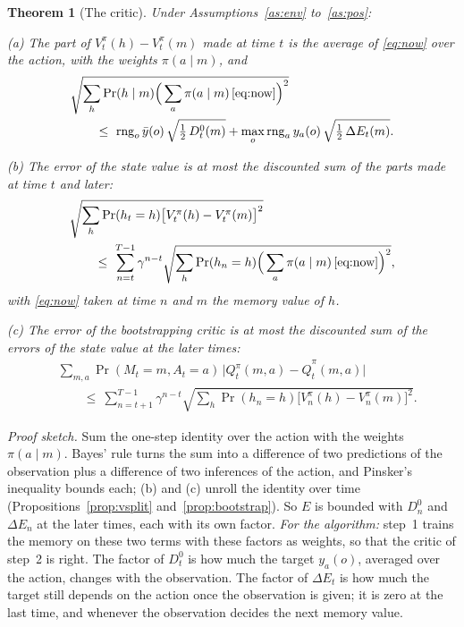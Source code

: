 \documentclass{article}
\newtheorem{theorem}{Theorem}
\newcounter{algo}
\theoremstyle{definition}
\newcommand{\dE}{\Delta E}
\newcommand{\rng}{\operatorname{rng}}
\begin{document}
\begin{theorem}[The critic]\label{thm:critic}
Under Assumptions~\ref{as:env} to~\ref{as:pos}:

(a) The part of $V^\pi_t(h)-V^\pi_t(m)$ made at time $t$ is the average of \eqref{eq:now} over the action, with the weights $\pi(a\mid m)$, and
\begin{align*}
&\sqrt{\sum_h\Pr(h\mid m)\Big(\sum_a\pi(a\mid m)\,\eqref{eq:now}\Big)^2}\\
&\qquad\le\ \rng_o\bar y(o)\,\sqrt{\tfrac12\,D^0_t(m)}+\max_o\rng_ay_a(o)\,\sqrt{\tfrac12\,\dE_t(m)}.
\end{align*}

(b) The error of the state value is at most the discounted sum of the parts made at time $t$ and later:
\begin{align*}
&\sqrt{\sum_h\Pr(h_t=h)\big[V^\pi_t(h)-V^\pi_t(m)\big]^2}\\
&\qquad\le\ \sum_{n=t}^{T-1}\gamma^{n-t}\sqrt{\sum_h\Pr(h_n=h)\Big(\sum_a\pi(a\mid m)\,\eqref{eq:now}\Big)^2},
\end{align*}
with \eqref{eq:now} taken at time $n$ and $m$ the memory value of $h$.

(c) The error of the bootstrapping critic is at most the discounted sum of the errors of the state value at the later times:
\begin{align*}
&\sum_{m,a}\Pr(M_t=m,A_t=a)\,\big|Q^\pi_t(m,a)-\hat Q^\pi_t(m,a)\big|\\
&\qquad\le\ \sum_{n=t+1}^{T-1}\gamma^{n-t}\sqrt{\sum_h\Pr(h_n=h)\big[V^\pi_n(h)-V^\pi_n(m)\big]^2}.
\end{align*}
\end{theorem}

\emph{Proof sketch.} Sum the one-step identity over the action with the weights $\pi(a\mid m)$. Bayes' rule turns the sum into a difference of two predictions of the observation plus a difference of two inferences of the action, and Pinsker's inequality bounds each; (b) and (c) unroll the identity over time (Propositions~\ref{prop:vsplit} and~\ref{prop:bootstrap}). So $E$ is bounded with $D^0_n$ and $\dE_n$ at the later times, each with its own factor. \emph{For the algorithm:} step~1 trains the memory on these two terms with these factors as weights, so that the critic of step~2 is right. The factor of $D^0_t$ is how much the target $y_a(o)$, averaged over the action, changes with the observation. The factor of $\dE_t$ is how much the target still depends on the action once the observation is given; it is zero at the last time, and whenever the observation decides the next memory value.
\end{document}
